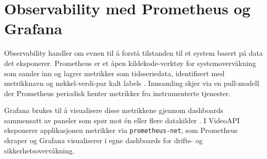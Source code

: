 \section{Observability med Prometheus og Grafana}
\label{sec:observability-prometheus-grafana}

Observability handler om evnen til å forstå tilstanden til et system basert på
data det eksponerer. Prometheus er et åpen kildekode-verktøy for systemovervåkning
som samler inn og lagrer metrikker som tidsseriedata, identifisert med metrikknavn
og nøkkel-verdi-par kalt labels \cite{prometheus_docs}. Innsamling skjer via en
pull-modell der Prometheus periodisk henter metrikker fra instrumenterte tjenester.

Grafana brukes til å visualisere disse metrikkene gjennom dashboards sammensatt av
paneler som spør mot én eller flere datakilder \cite{grafana_docs}. I VideoAPI
eksponerer applikasjonen metrikker via \texttt{prometheus-net}, som Prometheus
skraper og Grafana visualiserer i egne dashboards for drifts- og sikkerhetsovervåkning.

